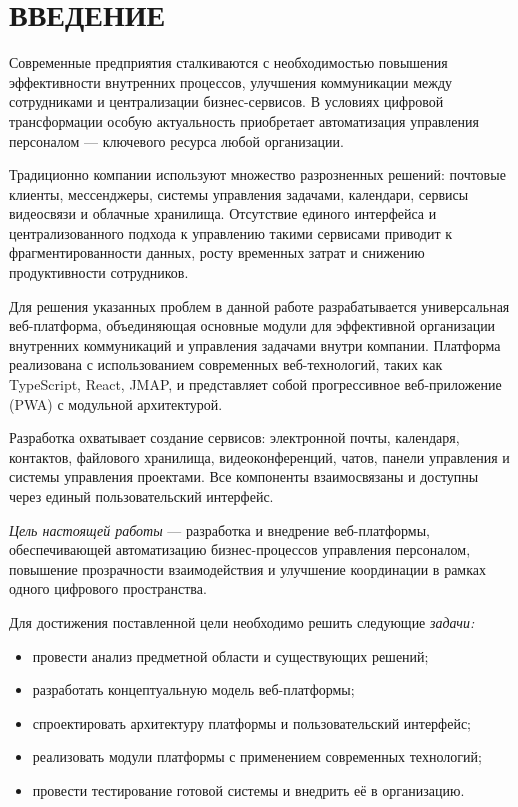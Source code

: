 \section*{ВВЕДЕНИЕ}

Современные предприятия сталкиваются с необходимостью повышения эффективности внутренних процессов, улучшения коммуникации между сотрудниками и централизации бизнес-сервисов. В условиях цифровой трансформации особую актуальность приобретает автоматизация управления персоналом — ключевого ресурса любой организации.

Традиционно компании используют множество разрозненных решений: почтовые клиенты, мессенджеры, системы управления задачами, календари, сервисы видеосвязи и облачные хранилища. Отсутствие единого интерфейса и централизованного подхода к управлению такими сервисами приводит к фрагментированности данных, росту временных затрат и снижению продуктивности сотрудников.

Для решения указанных проблем в данной работе разрабатывается универсальная веб-платформа, объединяющая основные модули для эффективной организации внутренних коммуникаций и управления задачами внутри компании. Платформа реализована с использованием современных веб-технологий, таких как TypeScript, React, JMAP, и представляет собой прогрессивное веб-приложение (PWA) с модульной архитектурой.

Разработка охватывает создание сервисов: электронной почты, календаря, контактов, файлового хранилища, видеоконференций, чатов, панели управления и системы управления проектами. Все компоненты взаимосвязаны и доступны через единый пользовательский интерфейс.

\emph{Цель настоящей работы} — разработка и внедрение веб-платформы, обеспечивающей автоматизацию бизнес-процессов управления персоналом, повышение прозрачности взаимодействия и улучшение координации в рамках одного цифрового пространства.

Для достижения поставленной цели необходимо решить следующие \emph{задачи:}
\begin{itemize}
\item провести анализ предметной области и существующих решений;
\item разработать концептуальную модель веб-платформы;
\item спроектировать архитектуру платформы и пользовательский интерфейс;
\item реализовать модули платформы с применением современных технологий;
\item провести тестирование готовой системы и внедрить её в организацию.
\end{itemize}

